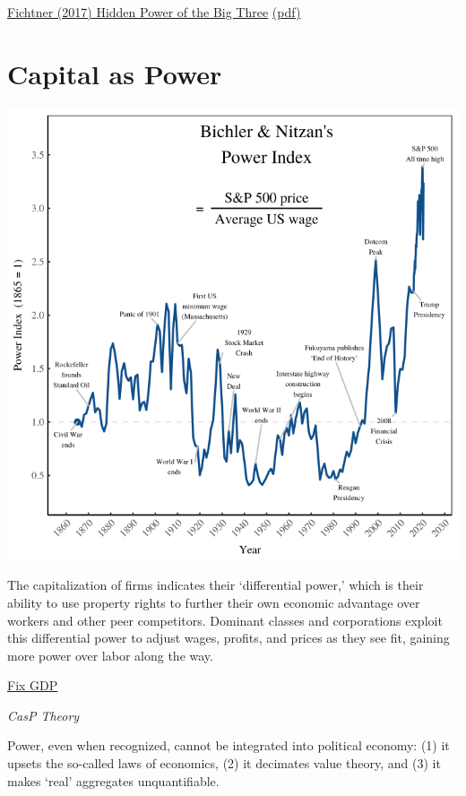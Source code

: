 \documentclass[
]{book}
\begin{document}
\href{https://www.cambridge.org/core/journals/business-and-politics/article/hidden-power-of-the-big-three-passive-index-funds-reconcentration-of-corporate-ownership-and-new-financial-risk/30AD689509AAD62F5B677E916C28C4B6}{Fichtner (2017) Hidden Power of the Big Three}
\href{pdf/Fichtner_2017_Hidden_Power_Big3.pdf}{(pdf)}

\hypertarget{capital-as-power}{%
\chapter{Capital as Power}\label{capital-as-power}}

\includegraphics{fig/power_index.png}

The capitalization of firms indicates their `differential power,' which is their ability to use property rights to further their own economic advantage over workers and other peer competitors. Dominant classes and corporations exploit this differential power to adjust wages, profits, and prices as they see fit, gaining more power over labor along the way.

\href{https://economicsfromthetopdown.com/2019/12/15/why-we-should-abandon-real-gdp-as-a-measure-of-economic-activity/}{Fix GDP}

\emph{CasP Theory}

Power, even when recognized, cannot be integrated into political economy:
(1) it upsets the so-called laws of economics,
(2) it decimates value theory, and
(3) it makes `real' aggregates unquantifiable.
\end{document}
